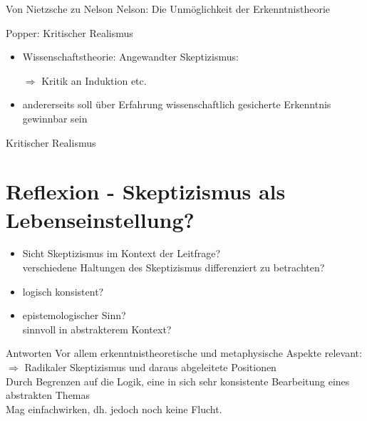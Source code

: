 \documentclass[12pt]{beamer}
\begin{document}
\begin{frame}{Von Nietzsche zu Nelson}
Nelson: \glqq Die Unmöglichkeit der Erkenntnistheorie\grqq
\end{frame}

\begin{frame}{Popper: Kritischer Realismus}
\begin{itemize}
\item Wissenschaftstheorie: Angewandter Skeptizismus:
\item[$\Rightarrow$] Kritik an Induktion etc.
\item andererseits soll über Erfahrung wissenschaftlich gesicherte Erkenntnis gewinnbar sein
\end{itemize}
\glqq Kritischer Realismus\grqq
\end{frame}

\section{Reflexion - Skeptizismus als Lebenseinstellung?}
\begin{frame}
\begin{itemize}
\item Sicht Skeptizismus im Kontext der Leitfrage?\\
verschiedene Haltungen des Skeptizismus differenziert zu betrachten?
\item logisch konsistent?
\item epistemologischer Sinn?\\
sinnvoll in abstrakterem Kontext? %
\end{itemize}
\end{frame}

\begin{frame}{Antworten}
Vor allem erkenntnistheoretische und metaphysische Aspekte relevant:\\
$\Rightarrow$ Radikaler Skeptizismus und daraus abgeleitete Positionen\\

Durch Begrenzen auf die Logik, eine in sich sehr konsistente Bearbeitung eines abstrakten Themas\\
Mag \glqq einfach\grqq wirken, dh. jedoch noch keine \glqq Flucht\grqq .
\end{frame}
\end{document}
